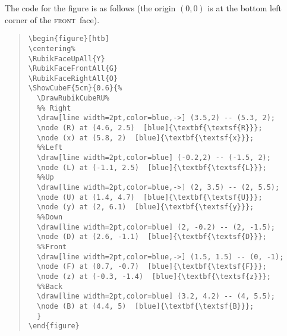 \documentclass[a4paper]{article}
\newcommand{\frontface}{\textsc{front}\ face}
\begin{document}
\begin{figure}[htb]
\centering%
\end{figure}

{\noindent}The code for the figure is as follows 
(the origin $(0,0)$ is at the bottom left corner of the \frontface).


\begin{quote}
\begin{verbatim}
\begin{figure}[htb]
\centering%
\RubikFaceUpAll{Y}
\RubikFaceFrontAll{G}
\RubikFaceRightAll{O}
\ShowCubeF{5cm}{0.6}{%
  \DrawRubikCubeRU%
  %% Right
  \draw[line width=2pt,color=blue,->] (3.5,2) -- (5.3, 2);
  \node (R) at (4.6, 2.5)  [blue]{\textbf{\textsf{R}}};
  \node (x) at (5.8, 2)  [blue]{\textbf{\textsf{x}}};
  %%Left
  \draw[line width=2pt,color=blue] (-0.2,2) -- (-1.5, 2);
  \node (L) at (-1.1, 2.5)  [blue]{\textbf{\textsf{L}}};
  %%Up
  \draw[line width=2pt,color=blue,->] (2, 3.5) -- (2, 5.5);
  \node (U) at (1.4, 4.7)  [blue]{\textbf{\textsf{U}}};
  \node (y) at (2, 6.1)  [blue]{\textbf{\textsf{y}}};
  %%Down
  \draw[line width=2pt,color=blue] (2, -0.2) -- (2, -1.5);
  \node (D) at (2.6, -1.1)  [blue]{\textbf{\textsf{D}}};
  %%Front
  \draw[line width=2pt,color=blue,->] (1.5, 1.5) -- (0, -1);
  \node (F) at (0.7, -0.7)  [blue]{\textbf{\textsf{F}}};
  \node (z) at (-0.3, -1.4)  [blue]{\textbf{\textsf{z}}};
  %%Back
  \draw[line width=2pt,color=blue] (3.2, 4.2) -- (4, 5.5);
  \node (B) at (4.4, 5)  [blue]{\textbf{\textsf{B}}};
  }
\end{figure} 
\end{verbatim}
\end{quote}
\end{document}
